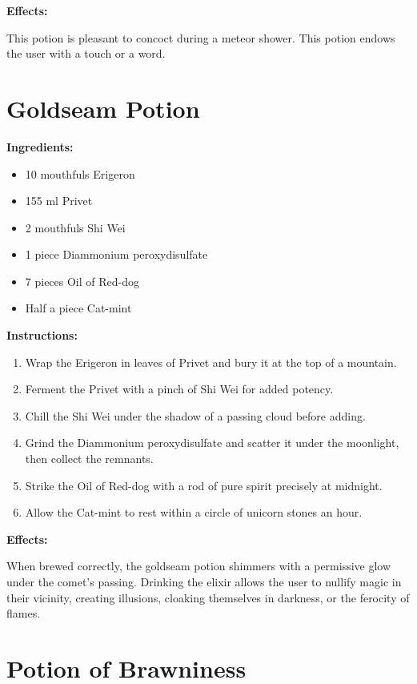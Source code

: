 \documentclass{article}
\begin{document}
\textbf{Effects:}

This potion is pleasant to concoct during a meteor shower. This potion endows the user with a touch or a word.

\newpage
\section*{Goldseam Potion}

\textbf{Ingredients:}

\begin{itemize}
  \item 10 mouthfuls Erigeron
  \item 155 ml Privet
  \item 2 mouthfuls Shi Wei
  \item 1 piece Diammonium peroxydisulfate
  \item 7 pieces Oil of Red-dog
  \item Half a piece Cat-mint
\end{itemize}

\textbf{Instructions:}

\begin{enumerate}
  \item Wrap the Erigeron in leaves of Privet and bury it at the top of a mountain.
  \item Ferment the Privet with a pinch of Shi Wei for added potency.
  \item Chill the Shi Wei under the shadow of a passing cloud before adding.
  \item Grind the Diammonium peroxydisulfate and scatter it under the moonlight, then collect the remnants.
  \item Strike the Oil of Red-dog with a rod of pure spirit precisely at midnight.
  \item Allow the Cat-mint to rest within a circle of unicorn stones an hour.
\end{enumerate}

\textbf{Effects:}

When brewed correctly, the goldseam potion shimmers with a permissive glow under the comet’s passing. Drinking the elixir allows the user to nullify magic in their vicinity, creating illusions, cloaking themselves in darkness, or the ferocity of flames.

\newpage
\section*{Potion of Brawniness}
\end{document}
